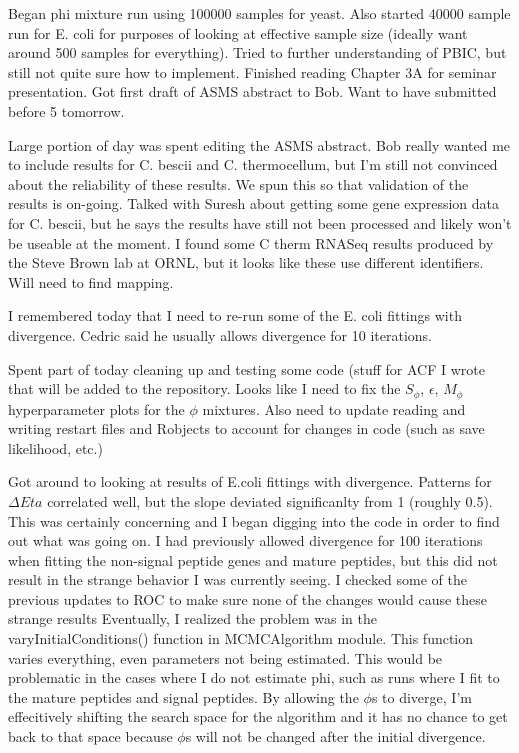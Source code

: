 \documentclass[11pt]{labbook}
\begin{document}
Began phi mixture run using 100000 samples for yeast. Also started 40000 sample run for E. coli for purposes of looking at effective sample size (ideally want around 500 samples for everything). Tried to further understanding of PBIC, but still not quite sure how to implement. Finished reading Chapter 3A for seminar presentation. Got first draft of ASMS abstract to Bob. Want to have submitted before 5 tomorrow.

Large portion of day was spent editing the ASMS abstract. Bob really wanted me to include results for C. bescii and C. thermocellum, but I'm still not convinced about the reliability of these results. We spun this so that validation of the results is on-going. Talked with Suresh about getting some gene expression data for C. bescii, but he says the results have still not been processed and likely won't be useable at the moment. I found some C therm RNASeq results produced by the Steve Brown lab at ORNL, but it looks like these use different identifiers. Will need to find mapping.

I remembered today that I need to re-run some of the E. coli fittings with divergence. Cedric said he usually allows divergence for 10 iterations. 


Spent part of today cleaning up and testing some code (stuff for ACF I wrote that will be added to the repository. Looks like I need to fix the $S_\phi$, $\epsilon$, $M_\phi$ hyperparameter plots for the  $\phi$ mixtures. Also need to update reading and writing restart files and Robjects to account for changes in code (such as save likelihood, etc.)

Got around to looking at results of E.coli fittings with divergence. Patterns for $\Delta Eta$ correlated well, but the slope deviated significanlty from 1 (roughly 0.5). This was certainly concerning and I began digging into the code in order to find out what was going on. I had previously allowed divergence for 100 iterations when fitting the non-signal peptide genes and mature peptides, but this did not result in the strange behavior I was currently seeing. I checked some of the previous updates to ROC to make sure none of the changes would cause these strange results Eventually, I realized the problem was in the varyInitialConditions() function in MCMCAlgorithm module. This function varies everything, even parameters not being estimated. This would be problematic in the cases where I do not estimate phi, such as runs where I fit to the mature peptides and signal peptides. By allowing the $\phi$s to diverge, I'm effecitively shifting the search space for the algorithm and it has no chance to get back to that space because $\phi$s will not be changed after the initial divergence. 
\end{document}
